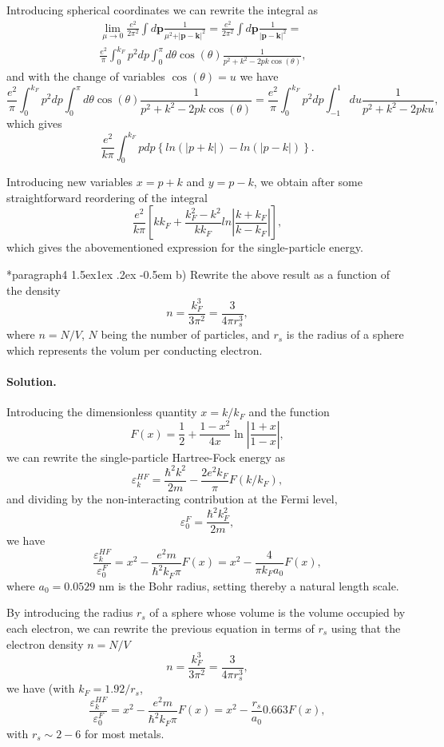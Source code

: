 \documentclass[%
oneside,                 %
final,                   %
10pt]{article}
\makeatletter
\newenvironment{doconceexercise}{}{}
\newcommand\subex{\@startsection*{paragraph}{4}{\z@}%
                  {1.5ex\@plus1ex \@minus.2ex}%
                  {-0.5em}%
                  {\normalfont\normalsize\bfseries}}
\makeatother
\begin{document}
\begin{doconceexercise}
Introducing spherical coordinates we can rewrite the integral as 
\begin{align}
\lim_{\mu \to 0}\frac{e^{2}}{ 2\pi^2}  \int d\mathbf{p}\frac{1}{\mu^2+\vert \mathbf{p}-\mathbf{k}\vert^2}=\frac{e^{2}}{ 2\pi^2}  \int d\mathbf{p}\frac{1}{\vert \mathbf{p}-\mathbf{k}\vert^2}=& \\
\frac{e^{2}}{\pi}  \int_0^{k_F} p^2dp\int_0^{\pi} d\theta\cos{(\theta)}\frac{1}{p^2+k^2-2pk\cos{(\theta)}},
\end{align}
and with the change of variables $\cos{(\theta)}=u$ we have 
\[
\frac{e^{2}}{\pi}  \int_0^{k_F} p^2dp\int_{0}^{\pi} d\theta\cos{(\theta)}\frac{1}{p^2+k^2-2pk\cos{(\theta)}}=\frac{e^{2}}{\pi}  \int_0^{k_F} p^2dp\int_{-1}^{1} du\frac{1}{p^2+k^2-2pku},
\]
which gives
\[
\frac{e^{2}}{k\pi}  \int_0^{k_F} pdp\left\{ln(\vert p+k\vert)-ln(\vert p-k\vert)\right\}.
\]

Introducing new variables $x=p+k$ and $y=p-k$, we obtain after some straightforward reordering of the integral
\[
\frac{e^{2}}{k\pi}\left[
kk_F+\frac{k_{F}^{2}-k^{2}}{kk_{F}}ln\left\vert\frac{k+k_{F}}
{k-k_{F}}\right\vert
\right],
\]
which gives the abovementioned expression for the single-particle energy.


\subex{b)}
Rewrite the above result as a function of the density
\[
n= \frac{k_F^3}{3\pi^2}=\frac{3}{4\pi r_s^3},
\]
where $n=N/V$, $N$ being the number of particles, and $r_s$ is the radius of a sphere which represents the volum per conducting electron.


\paragraph{Solution.}
Introducing the dimensionless quantity $x=k/k_F$ and the function
\[
F(x) = \frac{1}{2}+\frac{1-x^2}{4x}\ln{\left\vert \frac{1+x}{1-x}\right\vert},
\]
we can rewrite the single-particle Hartree-Fock energy as 
\[
\varepsilon_{k}^{HF}=\frac{\hbar^{2}k^{2}}{2m}-\frac{2e^{2}
k_{F}}{\pi}F(k/k_F),
\]
and dividing by the non-interacting contribution at the Fermi level, 
\[
\varepsilon_{0}^{F}=\frac{\hbar^{2}k_F^{2}}{2m},
\]
we have
\[
\frac{\varepsilon_{k}^{HF} }{\varepsilon_{0}^{F}}=x^2-\frac{e^2m}{\hbar^2 k_F\pi}F(x)=x^2-\frac{4}{\pi k_Fa_0}F(x),
\]
where $a_0=0.0529$ nm is the Bohr radius, setting thereby a natural length scale. 


By introducing the radius $r_s$ of a sphere whose volume is the volume occupied by each electron, we can rewrite the previous equation in terms of $r_s$ using that the electron density $n=N/V$
\[
n=\frac{k_F^3}{3\pi^2} = \frac{3}{4\pi r_s^3},
\]
we have (with $k_F=1.92/r_s$,
\[
\frac{\varepsilon_{k}^{HF} }{\varepsilon_{0}^{F}}=x^2-\frac{e^2m}{\hbar^2 k_F\pi}F(x)=x^2-\frac{r_s}{a_0}0.663F(x),
\]
with $r_s \sim 2-6$ for most metals.


\end{doconceexercise}
\end{document}
